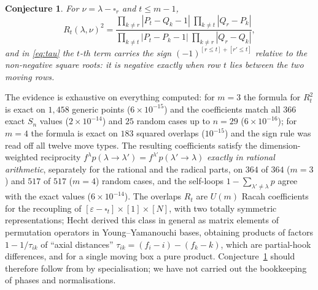 \documentclass[11pt]{amsart}
\newtheorem{conjecture}[theorem]{Conjecture}
\theoremstyle{definition}
\begin{document}
\begin{conjecture}\label{conj:Cm}
For $\nu=\lambda-\square_r$ and $t\le m-1$,
\[
R_t(\lambda,\nu)^2=\frac{\prod_{k\ne r}|P_t-Q_k-1|\ \prod_{k\ne t}|Q_r-P_k|}{\prod_{k\ne t}|P_t-P_k-1|\ \prod_{k\ne r}|Q_r-Q_k|},
\]
and in \eqref{eq:tau} the $t$-th term carries the sign $(-1)^{[r\le t]+[r'\le t]}$ relative to the non-negative square roots: it is negative exactly when row $t$ lies between the two moving rows.
\end{conjecture}

The evidence is exhaustive on everything computed: for $m=3$ the formula for $R_t^2$ is exact on $1{,}458$ generic points ($6\times10^{-15}$) and the coefficients match all $366$ exact $S_n$ values ($2\times10^{-14}$) and $25$ random cases up to $n=29$ ($6\times10^{-16}$); for $m=4$ the formula is exact on $183$ squared overlaps ($10^{-15}$) and the sign rule was read off all twelve move types. The resulting coefficients satisfy the dimension-weighted reciprocity $f^\lambda p(\lambda\to\lambda')=f^{\lambda'}p(\lambda'\to\lambda)$ \emph{exactly in rational arithmetic}, separately for the rational and the radical parts, on $364$ of $364$ ($m=3$) and $517$ of $517$ ($m=4$) random cases, and the self-loops $1-\sum_{\lambda'\ne\lambda}p$ agree with the exact values ($6\times10^{-14}$). The overlaps $R_t$ are $U(m)$ Racah coefficients for the recoupling of $[\varepsilon-\square_t]\times[1]\times[N]$, with two totally symmetric representations; Hecht \cite{Hecht} derived this class in general as matrix elements of permutation operators in Young--Yamanouchi bases, obtaining products of factors $1-1/\tau_{ik}$ of ``axial distances'' $\tau_{ik}=(f_i-i)-(f_k-k)$, which are partial-hook differences, and for a single moving box a pure product. Conjecture~\ref{conj:Cm} should therefore follow from \cite{Hecht} by specialisation; we have not carried out the bookkeeping of phases and normalisations.
\end{document}
